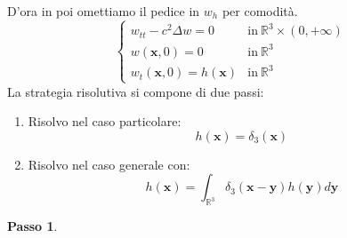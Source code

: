 \documentclass[10pt,a4paper,twoside,openright]{book}
\newcommand{\x}{\mathbf{x}}
\newcommand{\y}{\mathbf{y}}
\begin{document}
D'ora in poi omettiamo il pedice in $\displaystyle w_{h}$ per comodità.
\begin{equation*}
	\begin{cases}
		w_{tt} -c^{2} \Delta w=0            & \text{in} \ \mathbb{R}^{3} \times ( 0,+\infty ) \\
		w(\x ,0) =0                 & \text{in} \ \mathbb{R}^{3}                      \\
		w_{t}(\x ,0) =h(\x) & \text{in} \ \mathbb{R}^{3}                      
	\end{cases}
\end{equation*}
La strategia risolutiva si compone di due passi:
\begin{enumerate}
	\item Risolvo nel caso particolare:
		\begin{equation*}
			h(\x) =\delta _{3}(\x)
		\end{equation*}
	\item Risolvo nel caso generale con:
		\begin{equation*}
			h(\x) =\int _{\mathbb{R}^{3}} \delta _{3}(\x -\y) h(\y) d\y
		\end{equation*}
\end{enumerate}



\textbf{Passo 1}.
\end{document}
